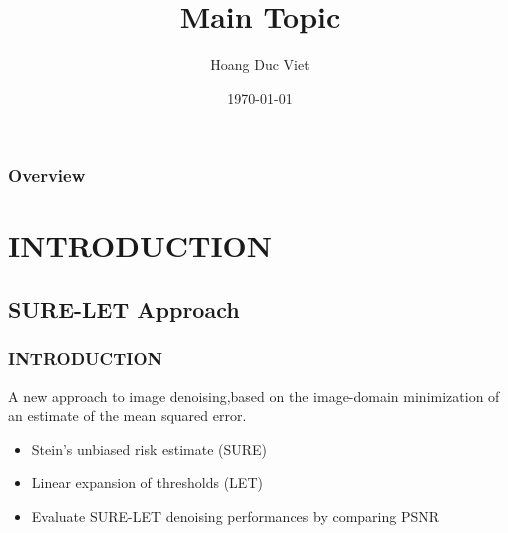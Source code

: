 \documentclass{beamer}
\title[SURE-LET APPROACH]{Main Topic } %
\author{Hoang Duc Viet} %
\institute[USTH] %
{
	ICT Lab \\ %
	\medskip
	\textit{viethdweb@gmail.com} %
}
\date{\today} %
\begin{document}
	
	\begin{frame}
		\titlepage %
	\end{frame}
	
	\begin{frame}
		\frametitle{Overview} %
		\tableofcontents %
	\end{frame}
	
	
	\section{INTRODUCTION} %
	
	\subsection{SURE-LET Approach} %
	
	\begin{frame}
		\frametitle{INTRODUCTION}
		A new approach to image denoising,based on the image-domain minimization of an estimate of the
		mean squared error.
		
	\begin{itemize}
		\item  Stein's unbiased risk estimate (SURE)
		\item  Linear expansion of thresholds (LET)
		\item  Evaluate SURE-LET denoising performances
		by comparing PSNR
	\end{itemize}
	\end{frame}
	
\end{document}
